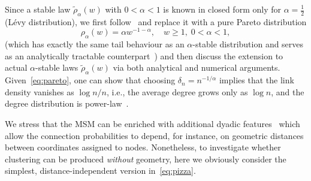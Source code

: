 \documentclass[ twocolumn,
 amsmath,amssymb,
 aps, pre, amsthm, amsfonts,
]{revtex4-2}
\begin{document}
Since a stable law $\tilde{\rho}_\alpha(w)$ with $0<\alpha<1$ is known in closed form only for $\alpha=\tfrac{1}{2}$ (L\'evy distribution), we first follow~\cite{avena2022inhomogeneous} and replace it with a pure Pareto distribution
\begin{equation}
    \rho_\alpha(w) = \alpha w^{-1-\alpha}, \quad w\ge1, \; 0<\alpha<1, \label{eq:pareto}
\end{equation}
(which has exactly the same tail behaviour as an $\alpha$-stable distribution and serves as an analytically tractable counterpart~\cite{samorodnitsky1994stable,avena2022inhomogeneous}) and then discuss the extension to actual $\alpha$-stable laws $\tilde{\rho}_\alpha(w)$ via both analytical and numerical arguments.
Given~\eqref{eq:pareto}, one can show that choosing $\delta_n=n^{-1/\alpha}$ implies that the link density vanishes as
$\log n/n$, i.e., the average degree grows only as $\log n$, and the degree distribution is power-law~\cite{avena2022inhomogeneous}.

We stress that the MSM can be enriched with additional dyadic features~\cite{garuccio2023multiscale,lalli2024geometry} which allow the connection probabilities to depend, for instance, on geometric distances between coordinates assigned to nodes. Nonetheless, to investigate whether clustering can be produced \emph{without} geometry, here we obviously consider the simplest, distance-independent version in~\eqref{eq:pizza}.
\end{document}
